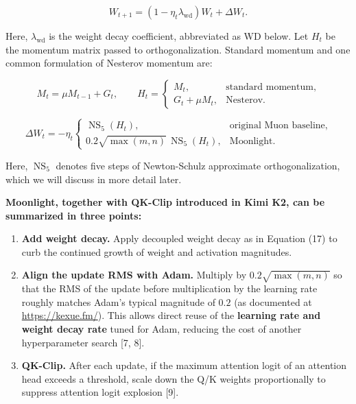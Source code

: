 \documentclass[
  english,
  10pt,
  a4paper,
]{article}
\providecommand{\tightlist}{%
  \setlength{\itemsep}{0pt}\setlength{\parskip}{0pt}}
\begin{document}
\nopagebreak[4]

\[
\boxed{W_{t+1}=(1-\eta_t\lambda_{\mathrm{wd}})W_t+\Delta W_t.}
\tag{17}
\]

Here, \(\lambda_{\mathrm{wd}}\) is the weight decay coefficient,
abbreviated as WD below. Let \(H_t\) be the momentum matrix passed to
orthogonalization. Standard momentum and one common formulation of
Nesterov momentum are:

\nopagebreak[4]

\[
M_t=\mu M_{t-1}+G_t,\qquad
H_t=\begin{cases}
M_t,&\text{standard momentum},\\
G_t+\mu M_t,&\text{Nesterov}.
\end{cases}
\tag{18}
\]

\nopagebreak[4]

\[
\Delta W_t=-\eta_t\begin{cases}
\operatorname{NS}_5(H_t),&\text{original Muon baseline},\\
0.2\sqrt{\max(m,n)}\,\operatorname{NS}_5(H_t),&\text{Moonlight}.
\end{cases}
\tag{19}
\]

Here, \(\operatorname{NS}_5\) denotes five steps of Newton-Schulz
approximate orthogonalization, which we will discuss in more detail
later.

\textbf{Moonlight, together with QK-Clip introduced in Kimi K2, can be
summarized in three points:}

\begin{enumerate}
\def\labelenumi{\arabic{enumi}.}
\tightlist
\item
  \textbf{Add weight decay.} Apply decoupled weight decay as in Equation
  (17) to curb the continued growth of weight and activation magnitudes.
\item
  \textbf{Align the update RMS with Adam.} Multiply by
  \(0.2\sqrt{\max(m,n)}\) so that the RMS of the update before
  multiplication by the learning rate roughly matches Adam's typical
  magnitude of \(0.2\) (as documented at \url{https://kexue.fm/}). This
  allows direct reuse of the \textbf{learning rate and weight decay
  rate} tuned for Adam, reducing the cost of another hyperparameter
  search {[}7, 8{]}.
\item
  \textbf{QK-Clip.} After each update, if the maximum attention logit of
  an attention head exceeds a threshold, scale down the Q/K weights
  proportionally to suppress attention logit explosion {[}9{]}.
\end{enumerate}
\end{document}
